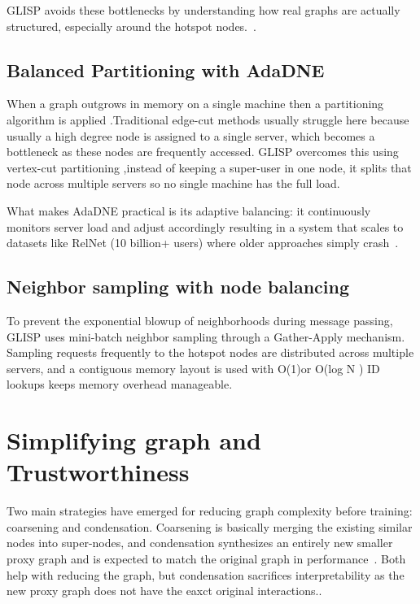 GLISP avoids these bottlenecks by understanding how real graphs are actually structured, especially around the hotspot nodes.~\cite{zhu2024glisp}.

\subsection{Balanced Partitioning with AdaDNE}

When a graph outgrows in memory on a single machine  then a partitioning algorithm is applied .Traditional edge-cut methods usually struggle here because usually a high degree node is assigned to a single server, which becomes a bottleneck as these nodes are  frequently accessed. GLISP overcomes this using vertex-cut partitioning ,instead of keeping a super-user in one node, it splits that node across multiple servers so no single machine has the full load.

What makes AdaDNE practical is its adaptive balancing: it continuously monitors server load and adjust accordingly resulting in a system that scales to datasets like RelNet (10 billion+ users) where older approaches simply crash~\cite{zhu2024glisp}.

\subsection{Neighbor sampling with node balancing}

To prevent the exponential blowup of neighborhoods during message passing, GLISP uses mini-batch neighbor sampling through a Gather-Apply mechanism. Sampling requests frequently to the hotspot nodes are distributed across multiple servers, and a contiguous memory layout is used with O(1)or O(log N ) ID lookups keeps memory overhead manageable.

\section{Simplifying graph and Trustworthiness}

Two main strategies have emerged for reducing graph complexity before training: coarsening and condensation. Coarsening is basically merging the existing similar nodes into super-nodes, and condensation synthesizes an entirely new smaller proxy graph and is expected to match the original graph in performance~\cite{hashemi2024graph}. Both help with reducing the graph, but condensation sacrifices interpretability as the new proxy graph does not have the eaxct original interactions.\cite{liang2025democratic}.

